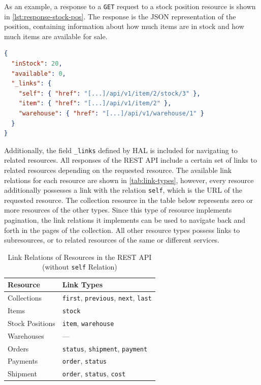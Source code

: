 As an example, a response to a \texttt{GET} request to a stock position resource is shown in \autoref{lst:response-stock-pos}.
The response is the \ac{JSON} representation of the position, containing information about how much items are in stock and how much items are available for sale.

\begin{lstlisting}[caption={Response to Fetching the Stock Position Collection}, language=json, label={lst:response-stock-pos}]
{
  "inStock": 20,
  "available": 0,
  "_links": {
    "self": { "href": "[...]/api/v1/item/2/stock/3" },
    "item": { "href": "[...]/api/v1/item/2" },
    "warehouse": { "href": "[...]/api/v1/warehouse/1" }
  }
}
\end{lstlisting}

Additionally, the field \texttt{\_links} defined by \ac{HAL} is included for navigating to related resources.
All responses of the \ac{REST} \ac{API} include a certain set of links to related resources depending on the requested resource.
The available link relations for each resource are shown in \autoref{tab:link-types}, however, every resource additionally possesses a link with the relation \texttt{self}, which is the URL of the requested resource.
The collection resource in the table below represents zero or more resources of the other types.
Since this type of resource implements pagination, the link relations it implements can be used to navigate back and forth in the pages of the collection.
All other resource types possess links to subresources, or to related resources of the same or different services.

\begin{table}[ht]
    \centering
    \begin{tabular}{@{}ll@{}}
        \toprule
        \textbf{Resource}   & \textbf{Link Types} \\
        \midrule
        Collections         & \texttt{first}, \texttt{previous}, \texttt{next}, \texttt{last} \\
        \midrule
        Items               & \texttt{stock} \\
        Stock Positions     & \texttt{item}, \texttt{warehouse} \\
        Warehouses          & --- \\
        \midrule
        Orders              & \texttt{status}, \texttt{shipment}, \texttt{payment} \\
        \midrule
        Payments            & \texttt{order}, \texttt{status} \\
        \midrule
        Shipment            & \texttt{order}, \texttt{status}, \texttt{cost} \\
        \bottomrule
    \end{tabular}
    \caption{Link Relations of Resources in the \acs{REST} \acs{API} (without \texttt{self} Relation)}\label{tab:link-types}
\end{table}

